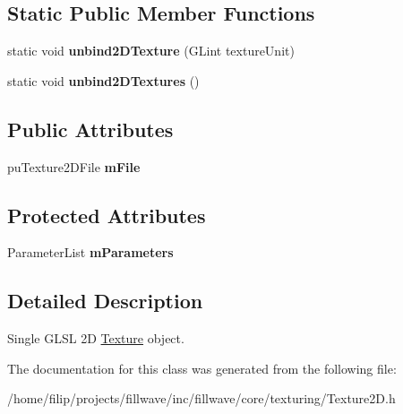 \subsection*{Static Public Member Functions}
\begin{DoxyCompactItemize}
\item 
\mbox{\label{classflw_1_1flc_1_1Texture2D_af55b2c3f280ee2fe859af13690b4c9ec}} 
static void {\bfseries unbind2\+D\+Texture} (G\+Lint texture\+Unit)
\item 
\mbox{\label{classflw_1_1flc_1_1Texture2D_a83b0eeaab09346f734a3c00727d423d1}} 
static void {\bfseries unbind2\+D\+Textures} ()
\end{DoxyCompactItemize}
\subsection*{Public Attributes}
\begin{DoxyCompactItemize}
\item 
\mbox{\label{classflw_1_1flc_1_1Texture2D_af422f8e2f1593a26049e70fd36026c1a}} 
pu\+Texture2\+D\+File {\bfseries m\+File}
\end{DoxyCompactItemize}
\subsection*{Protected Attributes}
\begin{DoxyCompactItemize}
\item 
\mbox{\label{classflw_1_1flc_1_1Texture2D_a018726676df0258939c42bfe38f8fc63}} 
Parameter\+List {\bfseries m\+Parameters}
\end{DoxyCompactItemize}


\subsection{Detailed Description}
Single G\+L\+SL 2D \hyperlink{classflw_1_1flc_1_1Texture}{Texture} object. 

The documentation for this class was generated from the following file\+:\begin{DoxyCompactItemize}
\item 
/home/filip/projects/fillwave/inc/fillwave/core/texturing/Texture2\+D.\+h\end{DoxyCompactItemize}
